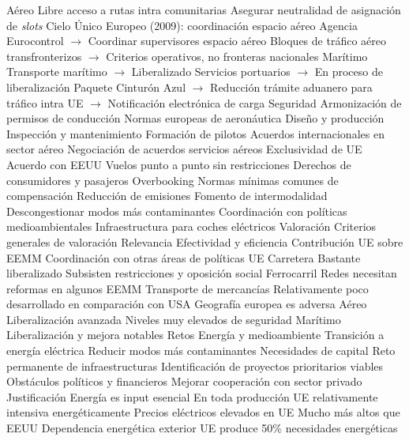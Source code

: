 \documentclass{nuevotema}
\begin{document}
\begin{esquemal}
				\4 Aéreo
				\4[] Libre acceso a rutas intra comunitarias
				\4[] Asegurar neutralidad de asignación de \textit{slots}
				\4[] Cielo Único Europeo (2009): coordinación espacio aéreo
				\4[] Agencia Eurocontrol
				\4[] $\to$ Coordinar supervisores espacio aéreo
				\4[] Bloques de tráfico aéreo transfronterizos
				\4[] $\to$ Criterios operativos, no fronteras nacionales
				\4 Marítimo
				\4[] Transporte marítimo
				\4[] $\to$ Liberalizado
				\4[] Servicios portuarios
				\4[] $\to$ En proceso de liberalización
				\4[] Paquete Cinturón Azul
				\4[] $\to$ Reducción trámite aduanero para tráfico intra UE
				\4[] $\to$ Notificación electrónica de carga
			\3 Seguridad
				\4 Armonización de permisos de conducción
				\4 Normas europeas de aeronáutica
				\4[] Diseño y producción
				\4[] Inspección y mantenimiento
				\4[] Formación de pilotos
			\3 Acuerdos internacionales en sector aéreo
				\4 Negociación de acuerdos servicios aéreos
				\4[] Exclusividad de UE
				\4 Acuerdo con EEUU
				\4[] Vuelos punto a punto sin restricciones
			\3 Derechos de consumidores y pasajeros
				\4 Overbooking
				\4 Normas mínimas comunes de compensación
			\3 Reducción de emisiones
				\4 Fomento de intermodalidad
				\4[] Descongestionar modos más contaminantes
				\4 Coordinación con políticas medioambientales
				\4 Infraestructura para coches eléctricos
		\2 Valoración
			\3 Criterios generales de valoración
				\4 Relevancia
				\4 Efectividad y eficiencia
				\4 Contribución UE sobre EEMM
				\4 Coordinación con otras áreas de políticas UE
			\3 Carretera
				\4 Bastante liberalizado
				\4 Subsisten restricciones y oposición social
			\3 Ferrocarril
				\4 Redes necesitan reformas en algunos EEMM
				\4 Transporte de mercancías
				\4[] Relativamente poco desarrollado en comparación con USA
				\4 Geografía europea es adversa
			\3 Aéreo
				\4 Liberalización avanzada
				\4 Niveles muy elevados de seguridad
			\3 Marítimo
				\4 Liberalización y mejora notables
		\2 Retos
			\3 Energía y medioambiente
				\4 Transición a energía eléctrica
				\4 Reducir modos más contaminantes
			\3 Necesidades de capital
				\4 Reto permanente de infraestructuras
			\3 Identificación de proyectos prioritarios viables
				\4 Obstáculos políticos y financieros
				\4 Mejorar cooperación con sector privado
	\1 
		\2 Justificación
			\3 Energía es input esencial
				\4 En toda producción
				\4 UE relativamente intensiva energéticamente
				\4 Precios eléctricos elevados en UE
				\4[] Mucho más altos que EEUU
			\3 Dependencia energética exterior
				\4 UE produce 50\% necesidades energéticas

\end{esquemal}
\end{document}
